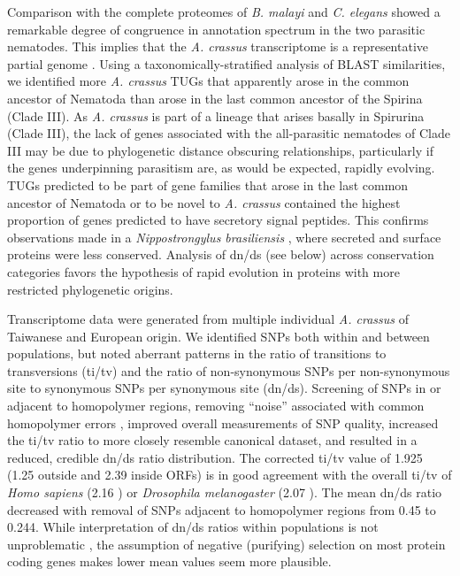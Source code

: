 \documentclass[10pt]{bmc_article}
\newenvironment{bmcformat}{\begin{raggedright}\baselineskip20pt\sloppy\setboolean{publ}{false}}{\end{raggedright}\baselineskip20pt\sloppy}
\begin{document}
\begin{bmcformat}
Comparison with the complete proteomes of \textit{B. malayi} and
\textit{C. elegans} showed a remarkable degree of congruence in
annotation spectrum in the two parasitic nematodes. This implies that
the \textit{A. crassus} transcriptome is a representative partial
genome \cite{parkinson_partigene--constructing_2004}. Using a
taxonomically-stratified analysis of BLAST similarities, we identified
more \textit{A. crassus} TUGs that apparently arose in the common
ancestor of Nematoda than arose in the last common ancestor of the
Spirina (Clade III). As \textit{A. crassus} is part of a lineage that
arises basally in Spirurina (Clade III), the lack of genes associated
with the all-parasitic nematodes of Clade III may be due to
phylogenetic distance obscuring relationships, particularly if the
genes underpinning parasitism are, as would be expected, rapidly
evolving. TUGs predicted to be part of gene families that arose in the
last common ancestor of Nematoda or to be novel to \textit{A. crassus}
contained the highest proportion of genes predicted to have secretory
signal peptides. This confirms observations made in a
\textit{Nippostrongylus brasiliensis} \cite{harcus_signal_2004}, where
secreted and surface proteins were less conserved. Analysis of dn/ds
(see below) across conservation categories favors the hypothesis of
rapid evolution in proteins with more restricted phylogenetic origins.

Transcriptome data were generated from multiple individual
\textit{A. crassus} of Taiwanese and European origin. We identified
SNPs both within and between populations, but noted aberrant patterns
in the ratio of transitions to transversions (ti/tv) and the ratio of
non-synonymous SNPs per non-synonymous site to synonymous SNPs per
synonymous site (dn/ds). Screening of SNPs in or adjacent to
homopolymer regions, removing “noise'' associated with common
homopolymer errors \cite{pmid21685085}, improved overall measurements
of SNP quality, increased the ti/tv ratio to more closely resemble
canonical dataset, and resulted in a reduced, credible dn/ds ratio
distribution. The corrected ti/tv value of 1.925 (1.25 outside and
2.39 inside ORFs) is in good agreement with the overall ti/tv of
\textit{Homo sapiens} (2.16 \cite{pmid21169219}) or \textit{Drosophila
  melanogaster} (2.07 \cite{pmid21143862}). The mean dn/ds ratio
decreased with removal of SNPs adjacent to homopolymer regions from
0.45 to 0.244. While interpretation of dn/ds ratios within populations
is not unproblematic \cite{pmid19081788}, the assumption of negative
(purifying) selection on most protein coding genes makes lower mean
values seem more plausible.



\end{bmcformat}
\end{document}
